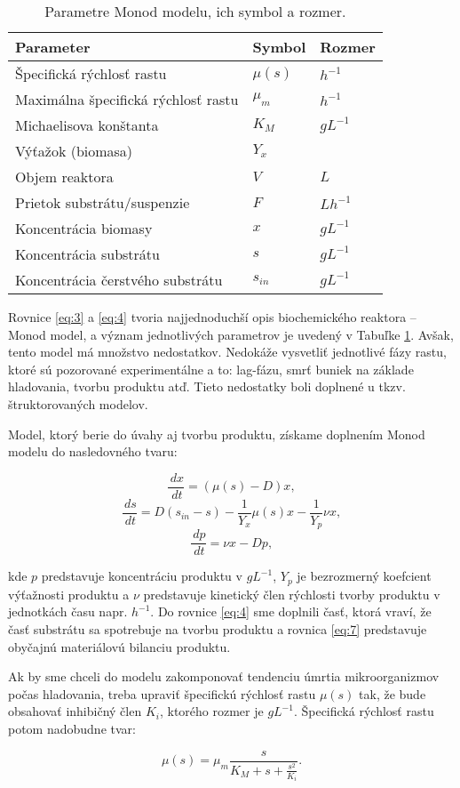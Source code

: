 \begin{table}[H]
	\centering
	\caption{Parametre Monod modelu, ich symbol a rozmer.}
	\label{tab: 2}
	\begin{tabular}{lll}
		\hline
		\textbf{Parameter} & \textbf{Symbol} & \textbf{Rozmer} \\
		\hline
		Špecifická rýchlosť rastu & $\mu(s)$ & $h^{-1}$ \\
		Maximálna špecifická rýchlosť rastu & $\mu_{m}$ & $h^{-1}$ \\
		Michaelisova konštanta & $K_{M}$ & $gL^{-1}$ \\
		Výťažok (biomasa) & $Y_{x}$ & \\
		Objem reaktora & $V$ & $L$ \\
		Prietok substrátu/suspenzie & $F$ & $Lh^{-1}$ \\
		Koncentrácia biomasy & $x$ & $gL^{-1}$ \\
		Koncentrácia substrátu & $s$ & $gL^{-1}$ \\
		Koncentrácia čerstvého substrátu & $s_{in}$ & $gL^{-1}$ \\
		\hline
	\end{tabular}
\end{table}

Rovnice \ref{eq:3} a \ref{eq:4} tvoria najjednoduchší opis biochemického reaktora -- Monod model, a význam jednotlivých parametrov je uvedený v Tabuľke \ref{tab: 2}. Avšak, tento model má množstvo nedostatkov. Nedokáže vysvetliť jednotlivé fázy rastu, ktoré sú pozorované experimentálne a to: lag-fázu, smrť buniek na základe hladovania, tvorbu produktu atď. Tieto nedostatky boli doplnené u tkzv. štruktorovaných modelov.

Model, ktorý berie do úvahy aj tvorbu produktu, získame doplnením Monod modelu do nasledovného tvaru: 

\begin{equation} \label{eq:5}
\frac{\,dx}{\,dt} = \left(\mu(s) - D\right)x,
\end{equation}
\begin{equation} \label{eq:6}
\frac{\,ds}{\,dt} = D\left(s_{in} - s\right) - \frac{1}{Y_{x}}\mu(s)x - \frac{1}{Y_{p}}\nu x,
\end{equation}
\begin{equation} \label{eq:7}
	\frac{\,dp}{\,dt} = \nu x - Dp,
\end{equation}

\noindent kde $p$ predstavuje koncentráciu produktu v $gL^{-1}$, $Y_{p}$ je bezrozmerný koefcient výťažnosti produktu a $\nu$ predstavuje kinetický člen rýchlosti tvorby produktu v jednotkách času napr. $ h^{-1} $. Do rovnice \ref{eq:4} sme doplnili časť, ktorá vraví, že časť substrátu sa spotrebuje na tvorbu produktu a rovnica \ref{eq:7} predstavuje obyčajnú materiálovú bilanciu produktu.

Ak by sme chceli do modelu zakomponovať tendenciu úmrtia mikroorganizmov počas hladovania, treba upraviť špecifickú rýchlosť rastu $\mu(s)$ tak, že bude obsahovať inhibičný člen $ K_i $, ktorého rozmer je $gL^{-1}$. Špecifická rýchlosť rastu potom nadobudne tvar:

\begin{equation} \label{eq:8}
	\mu(s) = \mu_{m}\frac{s}{K_{M} + s + \frac{s^2}{K_i}}.
\end{equation}
